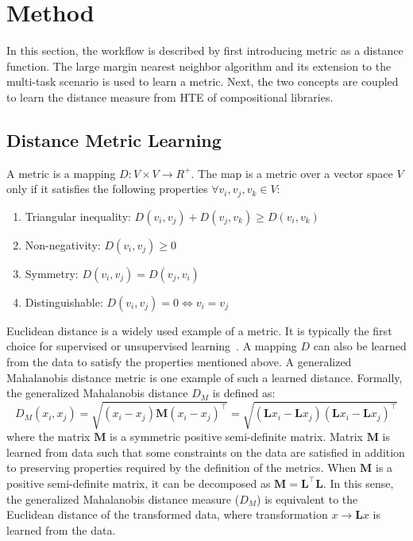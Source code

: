 \section{Method}
In this section, the workflow is described by first introducing metric as a distance function. 
The large margin nearest neighbor algorithm and its extension to the multi-task scenario is used to learn a metric. 
Next, the two concepts are coupled to learn the distance measure from HTE of compositional libraries.


\subsection{ Distance Metric Learning}
A metric is a mapping $D:V \times V \rightarrow R^+$. The map is a metric over a vector space $V$ only if it satisfies the following properties $\forall v_i,v_j,v_k \in V$:
\begin{enumerate}
    \item Triangular inequality:  $D(v_i,v_j)+D(v_j,v_k) \geq D(v_i,v_k)$
    \item Non-negativity: $D(v_i,v_j) \geq 0 $ 
    \item Symmetry: $D(v_i,v_j)=D(v_j,v_i)$
    \item Distinguishable: $D(v_i,v_j)=0 \iff v_i=v_j$
\end{enumerate}
Euclidean distance is a widely used example of a metric.
It is typically the first choice for supervised or unsupervised learning~\cite{dhanabal2011review,cover1967nearest}. 
A mapping $D$ can also be learned from the data to satisfy the properties mentioned above. 
A generalized Mahalanobis distance metric is one example of such a learned distance. Formally, the generalized Mahalanobis distance $D_M$ is defined as: 
\begin{equation}
    D_M (x_i,x_j) = \sqrt{(x_i-x_j)\mathbf{M}(x_i-x_j)^\top} 
                  = \sqrt{(\mathbf{L} x_i- \mathbf{L} x_j)(\mathbf{L} x_i- \mathbf{L} x_j)^\top}
    \label{eq1}
\end{equation}
where the matrix \(\mathbf{M}\) is a symmetric positive semi-definite matrix. Matrix \(\mathbf{M}\) is learned from data such that some constraints on the data are satisfied in addition to preserving properties required by the definition of the metrics. 
When \(\mathbf{M}\) is a positive semi-definite matrix, it can be decomposed as \(\mathbf{M=L^\top L}\).
In this sense, the generalized Mahalanobis distance measure ($D_M$) is equivalent to the Euclidean distance of the transformed data, where transformation $x\rightarrow \mathbf{L}x$ is learned from the data. 

